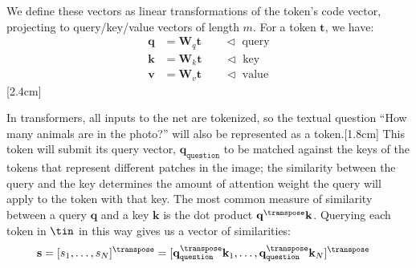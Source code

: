 We define these vectors as linear transformations of the token's code vector, projecting to query/key/value vectors of length $m$. For a token $\mathbf{t}$, we have:
\begin{align}
    \mathbf{q} &= \mathbf{W}_q \mathbf{t} \quad\quad \triangleleft \text{ query}\\
    \mathbf{k} &= \mathbf{W}_k \mathbf{t} \quad\quad \triangleleft \text{ key}\\
    \mathbf{v} &= \mathbf{W}_v \mathbf{t} \quad\quad \triangleleft \text{ value}
\end{align}
[2.4cm]






In transformers, all inputs to the net are tokenized, so the textual question ``How many animals are in the photo?'' will also be represented as a token.[1.8cm] This token will submit its query vector, $\mathbf{q}_{\texttt{question}}$ to be matched against the keys of the tokens that represent different patches in the image; the similarity between the query and the key determines the amount of attention weight the query will apply to the token with that key. The most common measure of similarity between a query $\mathbf{q}$ and a key $\mathbf{k}$ is the dot product $\mathbf{q}^\transpose\mathbf{k}$. Querying each token in $\tin$ in this way gives us a vector of similarities: %
\begin{align}
    \mathbf{s} = [s_1, \ldots, s_N]^\transpose &= [\mathbf{q}_{\texttt{question}}^\transpose\mathbf{k}_1, \ldots, \mathbf{q}_{\texttt{question}}^\transpose\mathbf{k}_N]^\transpose \label{eqn:transformers:attention_question_keys}
\end{align}


